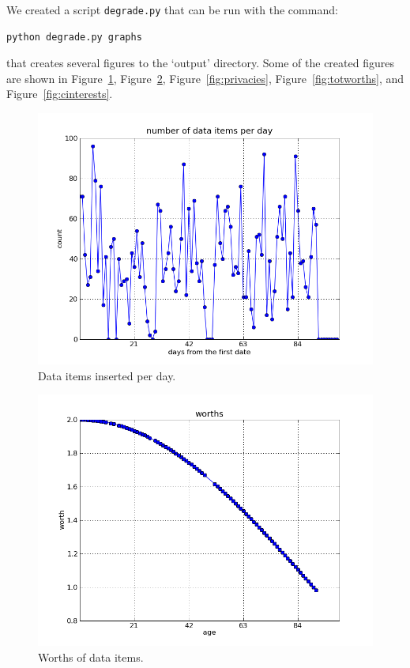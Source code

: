 \documentclass[a4paper,12pt,oneside,fleqn]{article}
\newcommand{\flabel}[1]{\label{fig:#1}}
\newcommand{\fref}[1]{Figure~\ref{fig:#1}}
\begin{document}
We created a script \texttt{degrade.py} that can be run with the
command:

\begin{verbatim}
python degrade.py graphs
\end{verbatim}

that creates several figures to the `output' directory. Some of the
created figures are shown in \fref{ages}, \fref{worths},
\fref{privacies}, \fref{totworths}, and \fref{cinterests}.

\begin{figure}[h]
\includegraphics[width=\linewidth]{img/ages.png}
\caption{Data items inserted per day.}
\flabel{ages}
\end{figure}

\begin{figure}[h]
\includegraphics[width=\linewidth]{img/worths.png}
\caption{Worths of data items.}
\flabel{worths}
\end{figure}
\end{document}
